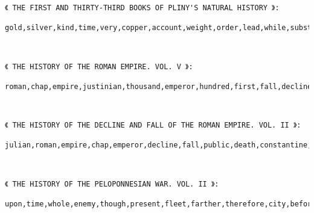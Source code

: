 \documentclass[11pt]{article}
\begin{document}
    \begin{Verbatim}[commandchars=\\\{\}]
《 THE FIRST AND THIRTY-THIRD BOOKS OF PLINY'S NATURAL HISTORY 》:
 gold,silver,kind,time,very,copper,account,weight,order,lead,while,substance,word,note,name,book,part,minium,term,water

    \end{Verbatim}

    \begin{center}
    \end{center}
    { \hspace*{\fill} \\}
    
    \begin{Verbatim}[commandchars=\\\{\}]
《 THE HISTORY OF THE ROMAN EMPIRE. VOL. V 》:
 roman,chap,empire,justinian,thousand,emperor,hundred,first,fall,decline,belisarius,rome,italy,king,name,death,city,reign,general,public

    \end{Verbatim}

    \begin{center}
    \end{center}
    { \hspace*{\fill} \\}
    
    \begin{Verbatim}[commandchars=\\\{\}]
《 THE HISTORY OF THE DECLINE AND FALL OF THE ROMAN EMPIRE. VOL. II 》:
 julian,roman,empire,chap,emperor,decline,fall,public,death,constantine,constantius,troops,theodosius,army,city,general,east,military,reign,imperial

    \end{Verbatim}

    \begin{center}
    \end{center}
    { \hspace*{\fill} \\}
    
    \begin{Verbatim}[commandchars=\\\{\}]
《 THE HISTORY OF THE PELOPONNESIAN WAR. VOL. II 》:
 upon,time,whole,enemy,though,present,fleet,farther,therefore,city,before,hundred,state,sicily,make,force,land,athenian,army,sent

    \end{Verbatim}
\end{document}
